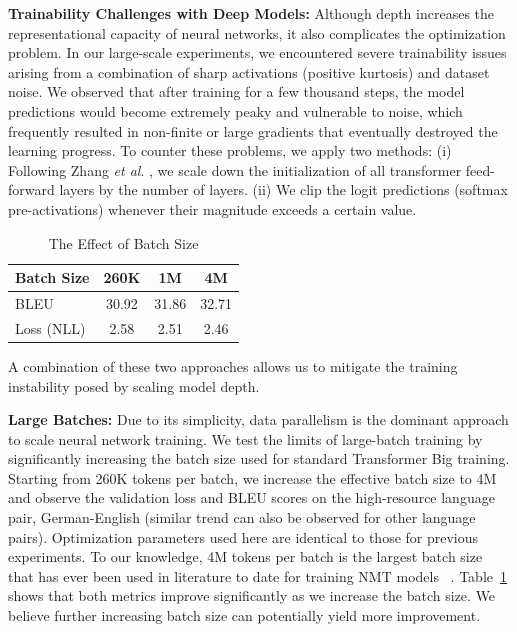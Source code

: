 \documentclass{article}
\def\onedot{.}
\def\etal{\emph{et al}\onedot}
\begin{document}
\textbf{Trainability Challenges with Deep Models:} Although depth increases the representational capacity of neural networks, it also complicates the optimization problem. In our large-scale experiments, we encountered severe trainability issues arising from a combination of sharp activations (positive kurtosis) and dataset noise. We observed that after training for a few thousand steps, the model predictions would become extremely peaky and vulnerable to noise, which frequently resulted in non-finite or large gradients that eventually destroyed the learning progress. To counter these problems, we apply two methods: (i) Following Zhang \etal{} \cite{zhang2019fixup}, we scale down the initialization of all transformer feed-forward layers by the number of layers. (ii) We clip the logit predictions (softmax pre-activations) whenever their magnitude exceeds a certain value. 
 \begin{table} 
\begin{center}
\caption{The Effect of Batch Size}
\label{tab:bsz}
\begin{tabular}{l|ccc}
\toprule
    Batch Size     & 260K  & 1M    & 4M    \\ \hline
    BLEU       & 30.92 & 31.86 & 32.71 \\
    Loss (NLL) & 2.58  & 2.51  & 2.46 \\    
\bottomrule    
\end{tabular}
\end{center}
\end{table}
A combination of these two approaches allows us to mitigate the training instability posed by scaling model depth.

\textbf{Large Batches:} Due to its simplicity, data parallelism is the dominant approach to scale neural network training\cite{DBLP:journals/corr/KeskarMNST16, DBLP:journals/corr/abs-1711-00489}. We test the limits of large-batch training by significantly increasing the batch size used for standard Transformer Big training. Starting from 260K tokens per batch, we increase the effective batch size to 4M and observe the validation loss and BLEU scores on the high-resource language pair, German-English (similar trend can also be observed for other language pairs). Optimization parameters used here are identical to those for previous experiments. 
To our knowledge, 4M tokens per batch is the largest batch size that has ever been used in literature to date for training NMT models ~\cite{ott-etal-2018-scaling}. Table~\ref{tab:bsz} shows that both metrics improve significantly as we increase the batch size. We believe further increasing batch size can potentially yield more improvement.
\end{document}
